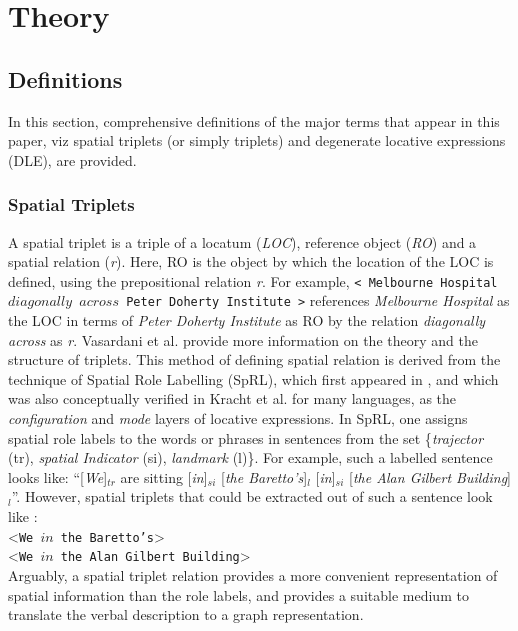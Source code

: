 \documentclass{sig-alternate}
\begin{document}
\section{Theory}
\subsection{Definitions}
In this section, comprehensive definitions of the major terms that appear in this paper, viz spatial triplets (or simply triplets) and degenerate locative expressions (DLE), are provided.
\subsubsection{Spatial Triplets}
A spatial triplet is a triple of a locatum (\textit{LOC}), reference object (\textit{RO}) and a spatial relation (\textit{r}). Here, RO is the object by which the location of the LOC is defined, using the prepositional relation \textit{r}. For example, \texttt{< Melbourne Hospital $diagonally$ $across$ Peter Doherty Institute >} references \textit{Melbourne Hospital} as the LOC in terms of \textit{Peter Doherty Institute} as RO by the relation \textit{diagonally across} as \textit{r}. Vasardani et al. \cite{maria:descriptions} provide more information on the theory and the structure of triplets. This method of defining spatial relation is derived from the technique of Spatial Role Labelling (SpRL), which first appeared in \cite{Kordjamshidi:labelling}, and which was also conceptually verified in Kracht et al. \cite{kracht:semantics} for many languages, as the \textit{configuration} and \textit{mode} layers of locative expressions. In SpRL, one assigns spatial role labels to the words or phrases in sentences from the set \{\textit{trajector} (tr), \textit{spatial Indicator} (si), \textit{landmark} (l)\}. For example, such a labelled sentence looks like:
``[\textit{We}]$_{tr}$ are sitting [\textit{in}]$_{si}$ [\textit{the Baretto's}]$_l$ [\textit{in}]$_{si}$ [\textit{the Alan Gilbert Building}]$_{l}$''. However, spatial triplets that could be extracted out of such a sentence look like : \\<\texttt{We ${in}$ the Baretto's}> \\<\texttt{We ${in}$ the Alan Gilbert Building}>\\
Arguably, a spatial triplet relation provides a more convenient representation of spatial information than the role labels, and provides a suitable medium to translate the verbal description to a graph representation.
\end{document}
